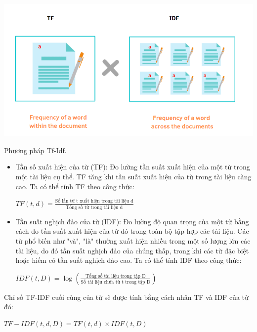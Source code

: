 \documentclass[a4paper, 12pt, openany]{book}
\begin{document}
\begin{minipage}{\linewidth}
    \captionsetup{type=figure}
    \centering
    \includegraphics[width=\linewidth]{./assets/images/tf-idf.png}
    \caption{Phương pháp Tf-Idf.}
\end{minipage}
\vspace{0.5cm}

\begin{itemize}
    \item Tần số xuất hiện của từ (TF): Đo lường tần suất xuất hiện của một từ trong một tài liệu cụ thể. TF tăng khi tần suất xuất hiện của từ trong tài liệu càng cao. Ta có thể tính TF theo công thức:
    \begin{center}
        \(TF(t, d) = \frac{\text{Số lần từ t xuất hiện trong tài liệu d}}{\text{Tổng số từ trong tài liệu d}}\)
    \end{center}
    
    \item Tần suất nghịch đảo của từ (IDF): Đo lường độ quan trọng của một từ bằng cách đo tần suất xuất hiện của từ đó trong toàn bộ tập hợp các tài liệu. Các từ phổ biến như "và", "là" thường xuất hiện nhiều trong một số lượng lớn các tài liệu, do đó tần suất nghịch đảo của chúng thấp, trong khi các từ đặc biệt hoặc hiếm có tần suất nghịch đảo cao.
    Ta có thể tính IDF theo công thức:

    \begin{center}
        \(IDF(t, D) = \log\left(\frac{\text{Tổng số tài liệu trong tập D}}{\text{Số tài liệu chứa từ t trong tập D}}\right)\)
    \end{center}
\end{itemize}

Chỉ số TF-IDF cuối cùng của từ sẽ được tính bằng cách nhân TF và IDF của từ đó:

\begin{center}
    \(TF-IDF(t, d, D) = TF(t, d) \times IDF(t, D)\)
\end{center}
\end{document}
